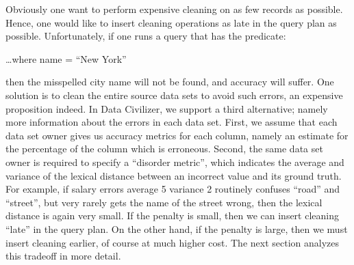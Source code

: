 Obviously one want to perform expensive cleaning on as few records as possible.
Hence, one would like to insert cleaning operations as late in the query plan as
possible.  Unfortunately, if one runs a query that has the predicate:

…where name = “New York”

then the misspelled city name will not be found, and accuracy will suffer.  One
solution is to clean the entire source data sets to avoid such errors, an
expensive proposition indeed.  In Data Civilizer, we support a third
alternative; namely more information about the errors in each data set.  First,
we assume that each data set owner gives us accuracy metrics for each column,
namely an estimate for the percentage of the column which is erroneous.  Second,
the same data set owner is required to specify a “disorder metric”, which
indicates the average and variance of the lexical distance between an incorrect
value and its ground truth.  For example, if salary errors average 5%
variance 2%
routinely confuses “road” and “street”, but very rarely gets the name of the
street wrong, then the lexical distance is again very small.   If the penalty is
small, then we can insert cleaning “late” in the query plan.  On the other hand,
if the penalty is large, then we must insert cleaning earlier, of course at much
higher cost.  The next section analyzes this tradeoff in more detail.

 
